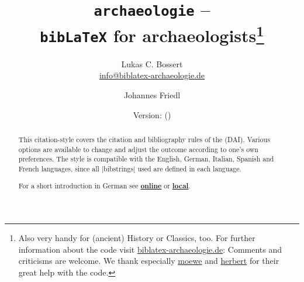 \documentclass[a4paper,
10pt,
greek,
french,
spanish,
italian,
ngerman,
english,
]{ltxdoc}
\begin{document}
\title{\texttt{archaeologie} -- \\\texttt{bib\LaTeX} for archaeologists\footnote{Also very handy for (ancient) History or Classics, too.
For further information about the code visit \href{http://www.biblatex-archaeologie.de}{biblatex-archaeologie.de}: 
Comments and criticisms are welcome.
We thank especially \href{https://tex.stackexchange.com/users/35864/moewe}{moewe} and \href{https://tex.stackexchange.com/users/2478/herbert}{herbert} for their great help with the code.%
}}
\author{Lukas C. Bossert\\{\small \href{mailto:info@biblatex-archaeologie.de}{info@biblatex-archaeologie.de}} 
\and Johannes Friedl}
\date{Version: \archaeologieversion{} (\archaeologiedate)} 
\maketitle

\begin{abstract}
\noindent This citation-style covers the citation and bibliography rules of the \DAI (DAI). 
Various options are available to change and adjust the outcome according to one's own preferences. 
The style is compatible with the English, German, Italian, Spanish and French languages, since all |bibstrings| used are defined in each language.
\bigskip

\noindent For a short introduction in German see   \href{pdfdeu.biblatex-archaeologie.de}{\textbf{online}} or   \href{file:archaeologie-ger.pdf}{\textbf{local}}.
\end{abstract}


\begin{multicols}{2}
\footnotesize\parskip=0mm \tableofcontents
\end{multicols}
\end{document}
